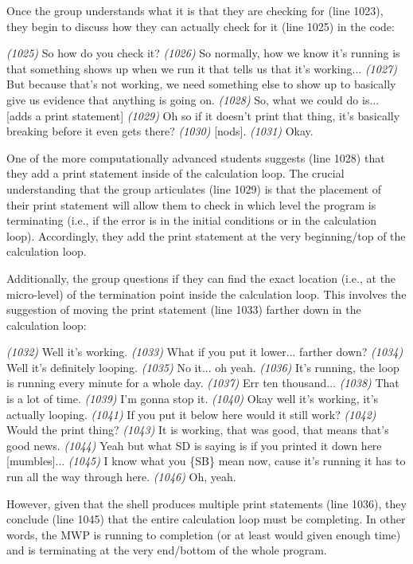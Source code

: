 \documentclass{msuphddissertation}
\begin{document}
\begin{doublespace}
Once the group understands what it is that they are checking for (line 1023), they begin to discuss how they can actually check for it (line 1025) in the code:\begin{description}
\SC \textit{(1025)} So how do you check it?
\SB \textit{(1026)} So normally, how we know it's running is that something shows up when we run it that tells us that it's working...
\SB \textit{(1027)} But because that's not working, we need something else to show up to basically give us evidence that anything is going on.
\SB \textit{(1028)} So, what we could do is... [adds a print statement]
\SD \textit{(1029)} Oh so if it doesn't print that thing, it's basically breaking before it even gets there?
\SB \textit{(1030)} [nods].	
\SD \textit{(1031)} Okay.
\end{description}  One of the more computationally advanced students suggests (line 1028) that they add a print statement inside of the calculation loop.  The crucial understanding that the group articulates (line 1029) is that the placement of their print statement will allow them to check in which level the program is terminating (i.e., if the error is in the initial conditions or in the calculation loop).  Accordingly, they add the print statement at the very beginning/top of the calculation loop.

Additionally, the group questions if they can find the exact location (i.e., at the micro-level) of the termination point inside the calculation loop.  This involves the suggestion of moving the print statement (line 1033) farther down in the calculation loop:
\begin{description}
\SB \textit{(1032)} Well it's working.
\SD \textit{(1033)} What if you put it lower... farther down?
\SB \textit{(1034)} Well it's definitely looping.
\SD \textit{(1035)} No it... oh yeah.
\SD \textit{(1036)} It's running, the loop is running every minute for a whole day.
\SA \textit{(1037)} Err ten thousand...				
\SB \textit{(1038)} That is a lot of time.
\SB \textit{(1039)} I'm gonna stop it.
\SB \textit{(1040)} Okay well it's working, it's actually looping.
\SD \textit{(1041)} If you put it below here would it still work?
\SB \textit{(1042)} Would the print thing?
\SB \textit{(1043)} It is working, that was good, that means that's good news.
\SC \textit{(1044)} Yeah but what SD is saying is if you printed it down here [mumbles]...
\SD \textit{(1045)} I know what you \{SB\} mean now, cause it's running it has to run all the way through here.
\SA \textit{(1046)} Oh, yeah.				
\end{description}  However, given that the shell produces multiple print statements (line 1036), they conclude (line 1045) that the entire calculation loop must be completing.  In other words, the MWP is running to completion (or at least would given enough time) and is terminating at the very end/bottom of the whole program.


\end{doublespace}
\end{document}

